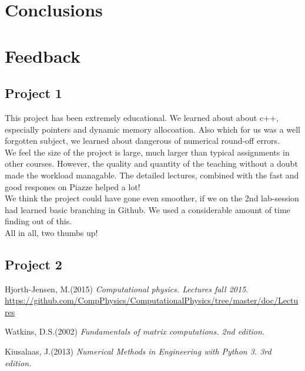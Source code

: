\documentclass{article}
\begin{document}
\section{Conclusions}


\section{Feedback}
\subsection{Project 1}
This project has been extremely educational. We learned about about c++, especially pointers and dynamic memory allocoation. Also which for us was a well forgotten subject, we learned about dangerous of numerical round-off errors. \\

We feel the size of the project is large, much larger than typical assignments in other courses. However, the quality and quantity of the teaching without a doubt made the workload managable. The detailed lectures, combined with the fast and good respones on Piazze helped a lot!\\

We think the project could have gone even smoother, if we on the 2nd lab-session had learned basic branching in Github. We used a considerable amount of time finding out of this.\\

All in all, two thumbs up!

\subsection{Project 2}

\pagebreak
\begin{thebibliography}{9}
	Hjorth-Jensen, M.(2015)
	\textit{Computational physics. Lectures fall 2015}. 
	\url{https://github.com/CompPhysics/ComputationalPhysics/tree/master/doc/Lectures}
	
	Watkins, D.S.(2002)
	\textit{Fundamentals of matrix computations. 2nd edition.}
	
	Kiusalaas, J.(2013)
	\textit{Numerical Methods in Engineering with Python 3. 3rd edition.}

\end{thebibliography}
\end{document}
